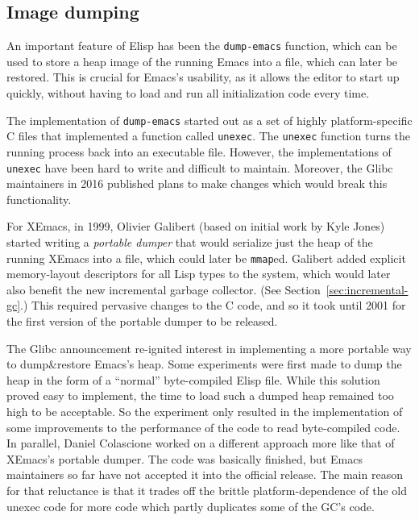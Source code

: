 \documentclass[format=acmsmall, review=false, screen=true]{acmart}
\newcommand \Elisp {Elisp}
\begin{document}
\subsection{Image dumping}
\label{sec:image-dumping}

An important feature of \Elisp{} has been the \texttt{dump-emacs}
function, which can be used to store a heap image of the running Emacs
into a file, which can later be restored.  This is crucial for Emacs's
usability, as it allows the editor to start up quickly, without
having to load and run all initialization code every time.

The implementation of \texttt{dump-emacs} started out as a set of
highly platform-specific C files that implemented a function called
\texttt{unexec}.  The \texttt{unexec} function turns the running
process back into an executable file.  However, the implementations of
\texttt{unexec} have been hard to write and difficult to maintain.
Moreover, the Glibc maintainers in 2016 published plans to
make changes which would break this functionality.

For XEmacs, in 1999, Olivier Galibert (based on initial work by Kyle
Jones) started writing a \emph{portable dumper} that would serialize
just the heap of the running XEmacs into a file, which could later be
\texttt{mmap}ed.  Galibert added explicit memory-layout descriptors
for all Lisp types to the system, which would later also benefit the
new incremental garbage collector.  (See
Section~\ref{sec:incremental-gc}.)  This required pervasive changes to
the C code, and so it took until 2001 for the first version of the
portable dumper to be released.

The Glibc announcement re-ignited interest in implementing a more portable
way to dump\&restore Emacs's heap.  Some experiments were first made to dump
the heap in the form of a ``normal'' byte-compiled \Elisp{} file.
While this solution proved easy to implement, the time to load such a dumped
heap remained too high to be acceptable.  So the experiment only resulted in
the implementation of some improvements to the performance of the code to
read byte-compiled code.  In parallel, Daniel Colascione worked on
a different approach more like that of XEmacs's portable dumper.  The code
was basically finished, but Emacs maintainers so far have not accepted it
into the official release.  The main reason for that reluctance is that it
trades off the brittle platform-dependence of the old unexec code for more
code which partly duplicates some of the GC's code.
\end{document}
